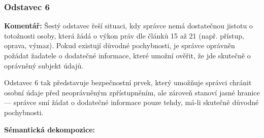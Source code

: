 
\subsubsection{Odstavec 6}
\label{sec:odstavec-6}
\begin{displayquote}  \cite{clanek12}
\end{displayquote}

\noindent \textbf{Komentář:}
Šestý odstavec řeší situaci, kdy správce nemá dostatečnou jistotu o totožnosti osoby, která žádá o výkon práv dle článků 15 až 21 (např. přístup, oprava, výmaz). Pokud existují důvodné pochybnosti, je správce oprávněn požádat žadatele o dodatečné informace, které umožní ověřit, že jde skutečně o oprávněný subjekt údajů.

Odstavec 6 tak představuje bezpečnostní prvek, který umožňuje správci chránit osobní údaje před neoprávněným zpřístupněním, ale zároveň stanoví jasné hranice — správce smí žádat o dodatečné informace pouze tehdy, má-li skutečně důvodné pochybnosti.

\vspace{1em}

\noindent \textbf{Sémantická dekompozice:}

